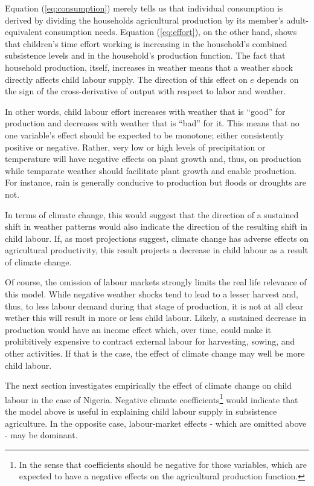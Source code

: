 \documentclass[a4paper,12pt]{article}
\theoremstyle{plain}
\theoremstyle{definition}
\theoremstyle{definition}
\theoremstyle{definition}
\theoremstyle{definition}
\begin{document}
Equation (\ref{eq:consumption}) merely tells us that individual consumption is derived by dividing the households agricultural production by its member's adult-equivalent consumption needs. Equation (\ref{eq:effort}), on the other hand, shows that children's time effort working is increasing in the household's combined subsistence levels and in the household's production function. The fact that household production, itself, increases in weather means that a weather shock directly affects child labour supply. The direction of this effect on $e$ depends on the sign of the cross-derivative of output with respect to labor and weather.

In other words, child labour effort increases with weather that is ``good'' for production and decreases with weather that is ``bad'' for it. This means that no one variable's effect should be expected to be monotone; either consistently positive or negative. Rather, very low or high levels of precipitation or temperature will have negative effects on plant growth and, thus, on production while temparate weather should facilitate plant growth and enable production. For instance, rain is generally conducive to production but floods or droughts are not.

In terms of climate change, this would suggest that the direction of a sustained shift in weather patterns would also indicate the direction of the resulting shift in child labour. If, as most projections suggest, climate change has adverse effects on agricultural productivity, this result projects a decrease in child labour as a result of climate change.

Of course, the omission of labour markets strongly limits the real life relevance of this model. While negative weather shocks tend to lead to a lesser harvest and, thus, to less labour demand during that stage of production, it is not at all clear wether this will result in more or less child labour. Likely, a sustained decrease in production would have an income effect which, over time, could make it prohibitively expensive to contract external labour for harvesting, sowing, and other activities. If that is the case, the effect of climate change may well be more child labour.

The next section investigates empirically the effect of climate change on child labour in the case of Nigeria. Negative climate coefficients\footnote{In the sense that coefficients should be negative for those variables, which are expected to have a negative effects on the agricultural production function.} would indicate that the model above is useful in explaining child labour supply in subsistence agriculture. In the opposite case, labour-market effects - which are omitted above - may be dominant.
\end{document}
